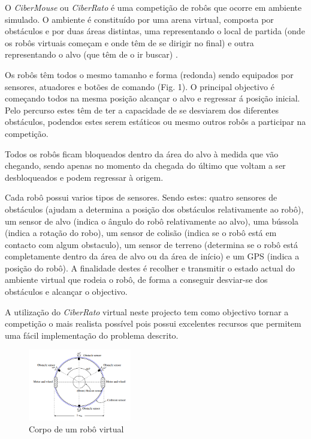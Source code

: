 \documentclass[conference]{IEEEtran}
\begin{document}
O \textit{CiberMouse} ou \textit{CiberRato} é uma competição de robôs que ocorre em ambiente simulado. O ambiente é constituído por uma arena virtual, composta por obstáculos e por duas áreas distintas, uma representando o local de partida (onde os robôs virtuais começam e onde têm de se dirigir no final) e outra representando o alvo (que têm de o ir buscar) \cite{IEEEhowto:ciberrato}.

Os robôs têm todos o mesmo tamanho e forma (redonda) sendo equipados por sensores, atuadores e botões de comando (Fig. 1). O principal objectivo é começando todos na mesma posição alcançar o alvo e regressar á posição inicial. Pelo percurso estes têm de ter a capacidade de se desviarem dos diferentes obstáculos, podendos estes serem estáticos ou mesmo outros robôs a participar na competição.

Todos os robôs ficam bloqueados dentro da área do alvo à medida que vão chegando, sendo apenas no momento da chegada do último que voltam a ser desbloqueados e podem regressar à origem.

Cada robô possui varios tipos de sensores. Sendo estes: quatro sensores de obstáculos (ajudam a determina a posição dos obstáculos relativamente ao robô), um sensor de alvo (indica o ângulo do robô relativamente ao alvo), uma bússola (indica a rotação do robo), um sensor de colisão (indica se o robô está em contacto com algum obstaculo), um sensor de terreno (determina se o robô está completamente dentro da área de alvo ou da área de início) e um GPS (indica a posição do robô). A finalidade destes é recolher e transmitir o estado actual do ambiente virtual que rodeia o robô, de forma a conseguir desviar-se dos obstáculos e alcançar o objectivo.

A utilização do \textit{CiberRato} virtual neste projecto tem como objectivo tornar a competição o mais realista possível pois possui excelentes recursos que permitem uma fácil implementação do problema descrito.


\begin{figure}
\centering
 \includegraphics[width=0.4\textwidth]{image/ciberMouse.png}
\caption{Corpo de um robô virtual}
\label{fig:patches}
\end{figure}
\end{document}
